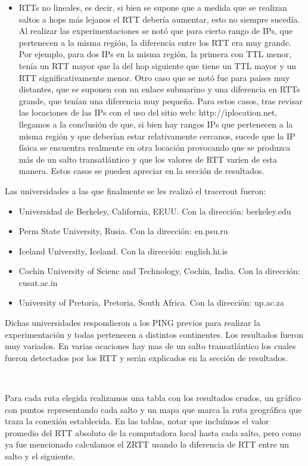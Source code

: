\begin{itemize}
    \item RTTs no lineales, es decir, si bien se supone que a medida que se realizan saltos a hops más lejanos el RTT debería aumentar, esto no siempre sucedía. Al realizar las experimentaciones se notó que para cierto rango de IPs, que pertenecen a la misma región, la diferencia entre los RTT era muy grande. Por ejemplo, para dos IPs en la misma región, la primera con TTL menor, tenía un RTT mayor que la del hop siguiente que tiene un TTL mayor y un RTT significativamente menor. Otro caso que se notó fue para países muy distantes, que se suponen con un enlace submarino y una diferencia en RTTs grande, que tenían una diferencia muy pequeña. Para estos casos, tras revisar las locaciones de las IPs con el uso del sitio web: http://iplocation.net, llegamos a la conclusión de que, si bien hay rangos IPs que pertenecen a la misma región y que deberían estar relativamente cercanos, sucede que la IP física se encuentra realmente en otra locación provocando que se produzca más de un salto transatlántico y que los valores de RTT varíen de esta manera. Estos casos se pueden apreciar en la sección de resultados.

\end{itemize}

Las universidades a las que finalmente se les realizó el tracerout fueron:

\begin{itemize}
	\item Universidad de Berkeley, California, EEUU. Con la dirección: berkeley.edu
	\item Perm State University, Rusia. Con la dirección: en.psu.ru
	\item Iceland University, Iceland. Con la dirección: english.hi.is
	\item Cochin University of Scienc and Technology, Cochin, India. Con la dirección: cusat.ac.in
	\item University of Pretoria, Pretoria, South Africa. Con la dirección: up.ac.za 
\end{itemize}


Dichas universidades respondieron a los PING previos para realizar la experimentación y todas pertenecen a distintos continentes. Los resultados fueron muy variados. En varias ocaciones hay mas de un salto transatlántico los cuales fueron detectados por los RTT y serán explicados en la sección de resultados.

~

Para cada ruta elegida realizamos una tabla con los resultados crudos, un gráfico con puntos representando cada salto y un mapa que marca la ruta geográfica que traza la conexión establecida. En las tablas, notar que incluímos el valor promedio del RTT absoluto de la computadora local hasta cada salto, pero como ya fue mencionado calculamos el ZRTT usando la diferencia de RTT entre un salto y el siguiente.

